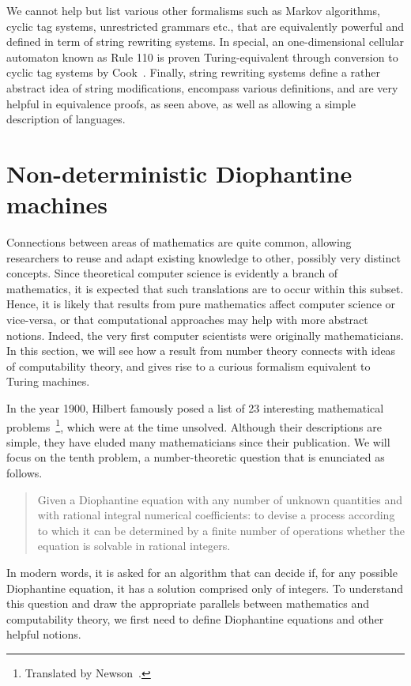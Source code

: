 \documentclass[12pt]{article}
\begin{document}
We cannot help but list various other formalisms such as Markov algorithms, cyclic tag systems, unrestricted grammars etc., that are equivalently powerful and defined in term of string rewriting systems. In special, an one-dimensional cellular automaton known as Rule 110 is proven Turing-equivalent through conversion to cyclic tag systems by Cook~\cite{Cook:article:2004:mar}. Finally, string rewriting systems define a rather abstract idea of string modifications, encompass various definitions, and are very helpful in equivalence proofs, as seen above, as well as allowing a simple description of languages.

\section{Non-deterministic Diophantine machines}\label{sec:nddm}

Connections between areas of mathematics are quite common, allowing researchers to reuse and adapt existing knowledge to other, possibly very distinct concepts. Since theoretical computer science is evidently a branch of mathematics, it is expected that such translations are to occur within this subset. Hence, it is likely that results from pure mathematics affect computer science or vice-versa, or that computational approaches may help with more abstract notions. Indeed, the very first computer scientists were originally mathematicians. In this section, we will see how a result from number theory connects with ideas of computability theory, and gives rise to a curious formalism equivalent to Turing machines.

In the year 1900, Hilbert famously posed a list of 23 interesting mathematical problems~\cite{Hilbert:article:1900:dec}\footnote{Translated by Newson~\cite{Hilbert:article:1902:jul}.}, which were at the time unsolved. Although their descriptions are simple, they have eluded many mathematicians since their publication. We will focus on the tenth problem, a number-theoretic question that is enunciated as follows.

\begin{quote}
    Given a Diophantine equation with any number of unknown quantities and with rational integral numerical coefficients: to devise a process according to which it can be determined by a finite number of operations whether the equation is solvable in rational integers.
\end{quote}

In modern words, it is asked for an algorithm that can decide if, for any possible Diophantine equation, it has a solution comprised only of integers. To understand this question and draw the appropriate parallels between mathematics and computability theory, we first need to define Diophantine equations and other helpful notions.
\end{document}
